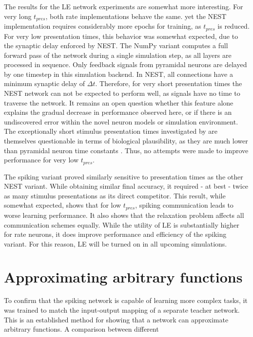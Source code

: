 The results for the LE network experiments are somewhat more interesting. For very long $t_{pres}$, both rate
implementations behave the same. yet the NEST implementation requires considerably more epochs for training, as
$t_{pres}$ is reduced. For very low presentation times, this behavior was somewhat expected, due to the synaptic delay
enforced by NEST. The NumPy variant computes a full forward pass of the network during a single simulation step, as all
layers are processed in sequence. Only feedback signals from pyramidal neurons are delayed by one timestep in this
simulation backend. In NEST, all connections have a minimum synaptic delay of $\Delta t$. Therefore, for very short
presentation times the NEST network can not be expected to perform well, as signals have no time to traverse the
network. It remains an open question whether this feature alone explains the gradual decrease in performance observed
here, or if there is an undiscovered error within the novel neuron models or simulation environment. The exceptionally
short stimulus presentation times investigated by \citep{Haider2021} are themselves questionable in terms of biological
plausibility, as they are much lower than pyramidal neuron time constants \citep{McCormick1985}. Thus, no attempts were
made to improve performance for very low $t_{pres}$.

The spiking variant proved similarly sensitive to presentation times as the other NEST variant. While obtaining similar
final accuracy, it required - at best - twice as many stimulus presentations as its direct competitor. This result,
while somewhat expected, shows that for low $t_{pres}$, spiking communication leads to worse learning performance. It
also shows that the relaxation problem affects all communication schemes equally. While the utility of LE is
substantially higher for rate neurons, it does improve performance and efficiency of the spiking variant. For this
reason, LE will be turned on in all upcoming simulations.

\section{Approximating arbitrary functions}\label{sec-func-approx}

To confirm that the spiking network is capable of learning more complex tasks, it was trained to match the input-output
mapping of a separate teacher network. This is an established method for showing that a network can approximate
arbitrary functions. A comparison between different

